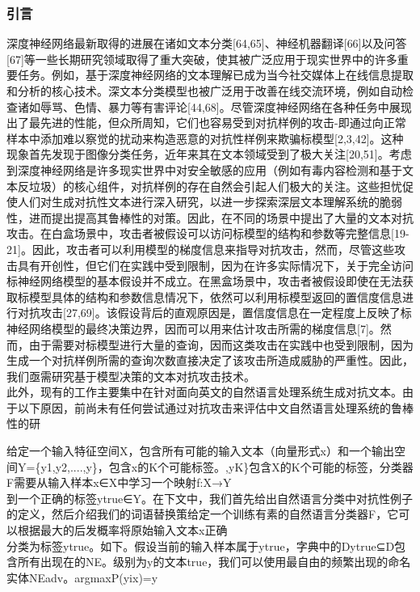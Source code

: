 \documentclass[
]{article}
\begin{document}
\hypertarget{ux5f15ux8a00}{%
\subsubsection{引言}\label{ux5f15ux8a00}}

深度神经网络最新取得的进展在诸如文本分类{[}64,65{]}、神经机器翻译{[}66{]}以及问答{[}67{]}等一些长期研究领域取得了重大突破，使其被广泛应用于现实世界中的许多重要任务。例如，基于深度神经网络的文本理解已成为当今社交媒体上在线信息提取和分析的核心技术。深文本分类模型也被广泛用于改善在线交流环境，例如自动检查诸如辱骂、色情、暴力等有害评论{[}44,68{]}。尽管深度神经网络在各种任务中展现出了最先进的性能，但众所周知，它们也容易受到对抗样例的攻击-即通过向正常样本中添加难以察觉的扰动来构造恶意的对抗性样例来欺骗标模型{[}2,3,42{]}。这种现象首先发现于图像分类任务，近年来其在文本领域受到了极大关注{[}20,51{]}。考虑到深度神经网络是许多现实世界中对安全敏感的应用（例如有毒内容检测和基于文本反垃圾）的核心组件，对抗样例的存在自然会引起人们极大的关注。这些担忧促使人们对生成对抗性文本进行深入研究，以进一步探索深层文本理解系统的脆弱性，进而提出提高其鲁棒性的对策。因此，在不同的场景中提出了大量的文本对抗攻击。在白盒场景中，攻击者被假设可以访问标模型的结构和参数等完整信息{[}19-21{]}。因此，攻击者可以利用模型的梯度信息来指导对抗攻击，然而，尽管这些攻击具有开创性，但它们在实践中受到限制，因为在许多实际情况下，关于完全访问标神经网络模型的基本假设并不成立。在黑盒场景中，攻击者被假设即使在无法获取标模型具体的结构和参数信息情况下，依然可以利用标模型返回的置信度信息进行对抗攻击{[}27,69{]}。该假设背后的直观原因是，置信度信息在一定程度上反映了标神经网络模型的最终决策边界，因而可以用来估计攻击所需的梯度信息{[}7{]}。然而，由于需要对标模型进行大量的查询，因而这类攻击在实践中也受到限制，因为生成一个对抗样例所需的查询次数直接决定了该攻击所造成威胁的严重性。因此，我们亟需研究基于模型决策的文本对抗攻击技术。\\
此外，现有的工作主要集中在针对面向英文的自然语言处理系统生成对抗文本。由于以下原因，前尚未有任何尝试通过对抗攻击来评估中文自然语言处理系统的鲁棒性的研

给定一个输入特征空间X，包含所有可能的输入文本（向量形式x）和一个输出空间Y=\{y1,y2,....,y\}，包含x的K个可能标签。,yK\}包含X的K个可能的标签，分类器F需要从输入样本x∈X中学习一个映射f:X→Y\\
到一个正确的标签ytrue∈Y。在下文中，我们首先给出自然语言分类中对抗性例子的定义，然后介绍我们的词语替换策给定一个训练有素的自然语言分类器F，它可以根据最大的后发概率将原始输入文本x正确\\
分类为标签ytrue。如下。假设当前的输入样本属于ytrue，字典中的Dytrue⊆D包含所有出现在的NE。级别为y的文本true，我们可以使用最自由的频繁出现的命名实体NEadv。argmaxP(yi\textbar x)=y
\end{document}
